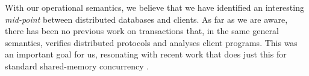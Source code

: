 With our operational semantics, we believe that we have identified an interesting \emph{mid-point}
between distributed databases and clients.
As far as we are aware, there has been no previous work on transactions
that, in the same general semantics, verifies distributed protocols and analyses client programs. 
This was an important goal for us, resonating with recent work
that does just this for standard shared-memory concurrency \cite{cap,tada,iris,fcsl}. 

